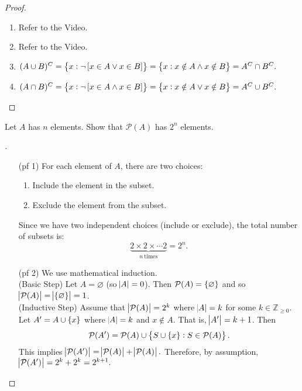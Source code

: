 \documentclass[11pt,openany]{article}
\begin{document}
\begin{proof}
	\begin{enumerate}[(1)]
		\item Refer to the Video\cite{set_thery_a}.
		\item Refer to the Video\cite{set_thery_a}.
		\item \textcolor{gray!30!white}{$(A\cup B)^C=\set{x:\lnot\left[x\in A\lor x\in B\right]}=\set{x:x\notin A\land x\notin B}=A^C\cap B^C.$}
		\item \textcolor{gray!30!white}{$(A\cap B)^C=\set{x:\lnot\left[x\in A\land x\in B\right]}=\set{x:x\notin A\lor x\notin B}=A^C\cup B^C.$}
	\end{enumerate}
\end{proof}

\vfill
\begin{exercise*}
	Let $A$ has $n$ elements. Show that $\mathcal{P}(A)$ has $2^n$ elements.
	\begin{proof}[\sol] 
		\textcolor{gray!30!white}{\begin{itemize}
			\item[(pf 1)] For each element of $A$, there are two choices:
			\begin{enumerate}
				\item Include the element in the subset.
				\item Exclude the element from the subset.
			\end{enumerate}
			Since we have two independent choices (include or exclude), the total number of subsets is:
			\[
			\underbrace{2\times 2\times\cdots 2}_{n\ \text{times}}=2^n.
			\]
			\item[(pf 2)] We use mathematical induction.
			\ \\
			(Basic Step) Let $A=\varnothing$ (so $\abs{A}=0$). Then $\mathcal{P}(A)=\set{\varnothing}$ and so $\abs{\mathcal{P}(A)}=\abs{\set{\varnothing}}=1$.
			\ \\
			(Inductive Step) Assume that $\abs{\mathcal{P}(A)}=2^k$ where $\abs{A}=k$ for some $k\in\mathbb{Z}_{\geq  0}$. Let $A'=A\cup\set{x}$ where $\abs{A}=k$ and $x\notin A$. That is, $\abs{A'}=k+1$. Then \[
			\mathcal{P}(A')=\mathcal{P}(A)\cup\set{S\cup \set{x}:S\in \mathcal{P}(A)}.
			\] This implies $\abs{\mathcal{P}(A')}=\abs{\mathcal{P}(A)} + \abs{\mathcal{P}(A)}.$ Therefore, by assumption, $\abs{\mathcal{P}(A')}=2^k + 2^k=2^{k+1}.$
		\end{itemize}}
	\end{proof}
\end{exercise*}
\end{document}
